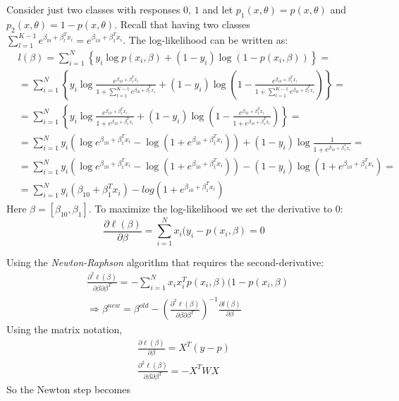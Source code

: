 \documentclass[12pt, letterpaper]{article}
\theoremstyle{definition}
\begin{document}
Consider just two classes with responses $0$, $1$ and let $p_1(x,\theta) =p(x,\theta) $ and $p_2(x,\theta) =1-p(x,\theta)$. Recall that having two classes $\sum_{l=1}^{K-1} e^{\beta_{l0}+\beta_l^Tx_i} = e^{\beta_{10}+\beta_1^Tx_i}$. The log-likelihood can be written as:
\begin{equation}
\begin{aligned}
&l(\beta) = \sum_{i=1}^N \left\lbrace y_i \log p\left(x_i,\beta\right) + \left(1-y_i\right) \log \left(1-p\left(x_i,\beta\right)\right)\right\rbrace =\\
&=\sum_{i=1}^N \left\lbrace y_i \log \frac{e^{\beta_{10} +\beta_{1}^T x_i}}{1+\sum_{l=1}^{K-1} e^{\beta_{l0}+\beta_l^Tx_i}} + \left(1-y_i\right) \log \left(1-\frac{e^{\beta_{10} +\beta_{1}^T x_i}}{1+\sum_{l=1}^{K-1} e^{\beta_{l0}+\beta_l^Tx_i}}\right)\right\rbrace = \\
&= \sum_{i=1}^N \left\lbrace y_i \log \frac{e^{\beta_{10} +\beta_{1}^T x_i}}{1+e^{\beta_{10}+\beta_1^Tx_i}} + \left(1-y_i\right) \log \left(1-\frac{e^{\beta_{10} +\beta_{1}^T x_i}}{1+e^{\beta_{10}+\beta_1^Tx_i}}\right)\right\rbrace = \\
&=\sum_{i=1}^N y_i \left(\log e^{\beta_{10} +\beta_{1}^T x_i} -\log \left(1+ e^{\beta_{10}+\beta_1^Tx_i}\right) \right) + \left(1-y_i\right) \log \frac{1}{1+ e^{\beta_{10}+\beta_1^Tx_i}} = \\
&=\sum_{i=1}^N y_i \left(\log e^{\beta_{10} +\beta_{1}^T x_i} -\log \left(1+ e^{\beta_{10}+\beta_1^Tx_i}\right) \right) - \left(1-y_i\right) \log \left(1+ e^{\beta_{10}+\beta_1^Tx_i}\right) = \\
&=\sum_{i=1}^N y_i \left(\beta_{10} +\beta_{1}^T x_i \right) -log \left(1+ e^{\beta_{10}+\beta_1^Tx_i}\right) 
\end{aligned}
\end{equation}
Here $\beta = \left[ \beta_{10}, \beta_1\right]$. To maximize the log-likelihood we set the derivative to $0$:
\begin{equation}
\frac{\partial \ell(\beta)}{\partial \beta} = \sum_{i=1}^N x_i  (y_i - p(x_i, \beta) = 0
\end{equation}

Using the \textit{Newton-Raphson} algorithm that requires the second-derivative:
\begin{align}
&\frac{\partial^2 \ell(\beta)}{\partial \beta \partial \beta^T} = -\sum_{i=1}^N x_ix_i^T   p(x_i, \beta) (1-p(x_i, \beta)\\
&\Rightarrow \beta^{new} = \beta^{old} - \left( \frac{\partial^2 \ell\left( \beta\right) }{\partial \beta \partial \beta^T} \right)^{-1}\frac{\partial l(\beta)}{\partial \beta}
\end{align}
Using the matrix notation,
\begin{align}
\frac{\partial \ell(\beta)}{\partial \beta} =  X^T (y-p) \\
\frac{\partial^2 \ell(\beta)}{\partial \beta \partial \beta^T} = -X^TWX
\end{align}
So the Newton step becomes
\end{document}
